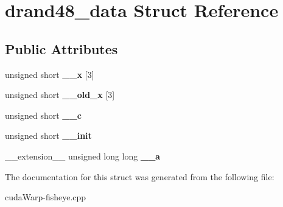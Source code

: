 \hypertarget{structdrand48__data}{}\section{drand48\+\_\+data Struct Reference}
\label{structdrand48__data}
\subsection*{Public Attributes}
\begin{DoxyCompactItemize}
\item 
unsigned short {\bfseries \+\_\+\+\_\+x} \mbox{[}3\mbox{]}\hypertarget{structdrand48__data_a28941ffc1e6671c5ae9a91086c33b817}{}\label{structdrand48__data_a28941ffc1e6671c5ae9a91086c33b817}

\item 
unsigned short {\bfseries \+\_\+\+\_\+old\+\_\+x} \mbox{[}3\mbox{]}\hypertarget{structdrand48__data_af4938105efc81813e3abbf271d64d8a5}{}\label{structdrand48__data_af4938105efc81813e3abbf271d64d8a5}

\item 
unsigned short {\bfseries \+\_\+\+\_\+c}\hypertarget{structdrand48__data_ae72f77c070a47c5f5cc0f68b7b548598}{}\label{structdrand48__data_ae72f77c070a47c5f5cc0f68b7b548598}

\item 
unsigned short {\bfseries \+\_\+\+\_\+init}\hypertarget{structdrand48__data_a6cf894490814b5e178ef55cab01c4de8}{}\label{structdrand48__data_a6cf894490814b5e178ef55cab01c4de8}

\item 
\+\_\+\+\_\+extension\+\_\+\+\_\+ unsigned long long {\bfseries \+\_\+\+\_\+a}\hypertarget{structdrand48__data_ac9de38d55505b8d0874dcbbf80d998b4}{}\label{structdrand48__data_ac9de38d55505b8d0874dcbbf80d998b4}

\end{DoxyCompactItemize}


The documentation for this struct was generated from the following file\+:\begin{DoxyCompactItemize}
\item 
cuda\+Warp-\/fisheye.\+cpp\end{DoxyCompactItemize}
